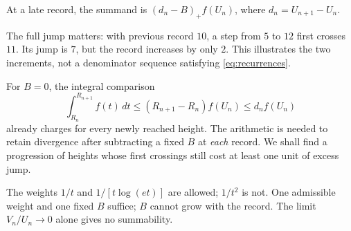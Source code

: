 \documentclass[11pt]{article}
\begin{document}
At a late record, the summand is $(d_n-B)_+f(U_n)$, where
$d_n=U_{n+1}-U_n$.

The full jump matters: with previous record $10$, a step from $5$ to
$12$ first crosses $11$. Its jump is $7$, but the record increases
by only $2$. This illustrates the two increments, not a denominator
sequence satisfying \eqref{eq:recurrences}.

For $B=0$, the integral comparison
\[
 \int_{R_n}^{R_{n+1}}f(t)\,dt
 \le (R_{n+1}-R_n)f(U_n)\le d_nf(U_n)
\]
already charges for every newly reached height. The arithmetic is
needed to retain divergence after subtracting a fixed $B$ at
\emph{each} record. We shall find a progression of heights whose first
crossings still cost at least one unit of excess jump.

The weights $1/t$ and $1/[t\log(et)]$ are allowed; $1/t^2$ is not.
One admissible weight and one fixed $B$ suffice; $B$ cannot grow
with the record. The limit $V_n/U_n\to0$ alone gives no summability.
\end{document}
